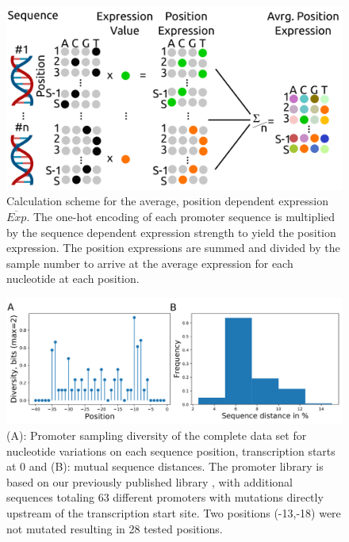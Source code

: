 \documentclass[utf8]{frontiersSCNS} %
\begin{document}
\begin{figure}[h!]%
    \begin{center}
        \includegraphics[width=.5\linewidth]{Figures/AvrgPosExpr.png}
    \end{center}
    \caption{Calculation scheme for the average, position dependent expression $\overline{Exp}$. The one-hot encoding of each promoter sequence is multiplied by the sequence dependent expression strength to yield the position expression. The position expressions are summed and divided by the sample number to arrive at the average expression for each nucleotide at each position.}
    \label{Fig:AvgPosExp}
\end{figure}

\begin{figure}[h!]%
    \begin{center}
        \includegraphics[width=.85\linewidth]{Figures/Pput-SampleDiversity.png}
    \end{center}
    \caption{(A): Promoter sampling diversity of the complete data set for nucleotide variations on each sequence position, transcription starts at 0 and (B): mutual sequence distances. The promoter library is based on our previously published library \citep{Kobbing2020}, with additional sequences totaling 63 different promoters with mutations directly upstream of the transcription start site. Two positions (\mbox{-13,-18}) were not mutated resulting in 28 tested positions.}
    \label{Fig:PputSampDiv}
\end{figure}
\end{document}
